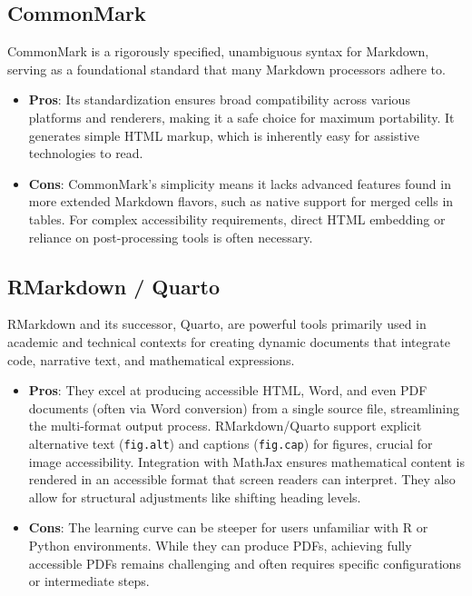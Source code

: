 \subsection{CommonMark}
CommonMark is a rigorously specified, unambiguous syntax for Markdown, serving as a foundational standard that many Markdown processors adhere to.\cite{MarkdownGuideExtended}\cite{DocsToMarkdown}\cite{QuartoCommonMark}
\begin{itemize}
    \item \textbf{Pros}: Its standardization ensures broad compatibility across various platforms and renderers, making it a safe choice for maximum portability.\cite{QuartoCommonMark}\cite{MConverter} It generates simple HTML markup, which is inherently easy for assistive technologies to read.\cite{SmashingMagazine}
    \item \textbf{Cons}: CommonMark's simplicity means it lacks advanced features found in more extended Markdown flavors, such as native support for merged cells in tables.\cite{DocsToMarkdown} For complex accessibility requirements, direct HTML embedding or reliance on post-processing tools is often necessary.\cite{DocsToMarkdown}
\end{itemize}

\subsection{RMarkdown / Quarto}
RMarkdown and its successor, Quarto, are powerful tools primarily used in academic and technical contexts for creating dynamic documents that integrate code, narrative text, and mathematical expressions.\cite{RMarkdownMassey}\cite{QuartoCommonMark}
\begin{itemize}
    \item \textbf{Pros}: They excel at producing accessible HTML, Word, and even PDF documents (often via Word conversion) from a single source file, streamlining the multi-format output process.\cite{QuartoCommonMark}\cite{AccessR} RMarkdown/Quarto support explicit alternative text (\texttt{fig.alt}) and captions (\texttt{fig.cap}) for figures, crucial for image accessibility.\cite{RMarkdownMassey}\cite{AccessR} Integration with MathJax ensures mathematical content is rendered in an accessible format that screen readers can interpret.\cite{CreateUW}\cite{RMarkdownMassey} They also allow for structural adjustments like shifting heading levels.\cite{QuartoCommonMark}
    \item \textbf{Cons}: The learning curve can be steeper for users unfamiliar with R or Python environments. While they can produce PDFs, achieving fully accessible PDFs remains challenging and often requires specific configurations or intermediate steps.\cite{CreateUW}\cite{QuartoCommonMark}
\end{itemize}

